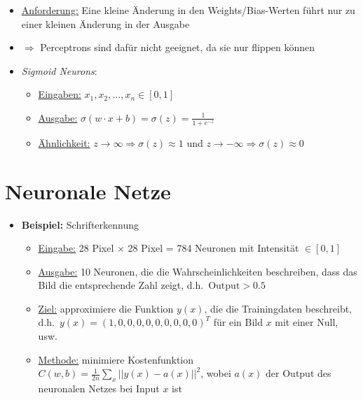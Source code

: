 \documentclass{scrartcl}
\begin{document}
\begin{itemize}
  \item \underline{Anforderung:} Eine kleine Änderung in den Weights/Bias-Werten führt nur zu einer kleinen Änderung in der Ausgabe
  \item $\Rightarrow$ Perceptrons sind dafür nicht geeignet, da sie nur flippen können
  \item \emph{Sigmoid Neurons}:
  \begin{itemize}
    \item \underline{Eingaben:} $x_1, x_2, \ldots, x_n \in [0, 1]$
    \item \underline{Ausgabe:} $\sigma(w \cdot x + b) = \sigma(z) = \frac{1}{1+e^{-z}}$
    \item \underline{Ähnlichkeit:} $z \rightarrow \infty \Rightarrow \sigma(z) \approx 1$ und $z \rightarrow - \infty \Rightarrow \sigma(z) \approx 0$
  \end{itemize}
\end{itemize}

\begin{center}
\end{center}

\section{Neuronale Netze}

\begin{itemize}
  \item \textbf{Beispiel:} Schrifterkennung
  \begin{itemize}
    \item \underline{Eingabe:} 28 Pixel $\times$ 28 Pixel = 784 Neuronen mit Intensität $\in [0,1]$
    \item \underline{Ausgabe:} 10 Neuronen, die die Wahrscheinlichkeiten beschreiben, dass das Bild die entsprechende Zahl zeigt, d.h.\ $\text{Output} > 0.5$
    \item \underline{Ziel:} approximiere die Funktion $y(x)$, die die Trainingdaten beschreibt, d.h.\ $y(x) = {(1, 0, 0, 0, 0, 0, 0, 0, 0, 0)}^T$ für ein Bild $x$ mit einer Null, usw.
    \item \underline{Methode:} minimiere Kostenfunktion $C(w,b) = \frac{1}{2n} \sum_x || y(x) - a(x) ||^2$, wobei $a(x)$ der Output des neuronalen Netzes bei Input $x$ ist
  \end{itemize}
\end{itemize}
\end{document}
